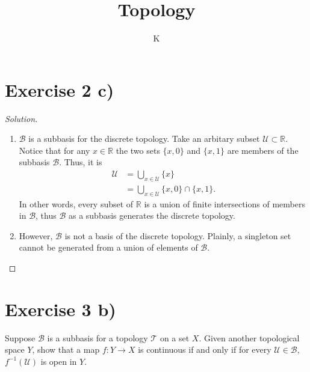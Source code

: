 \documentclass[a4paper]{article}
\title{Topology}
\author{K}
\begin{document}
\section*{Exercise 2 c)}

\begin{proof}[Solution]
    \begin{enumerate}
        \item \(\mathcal{B}\) is a subbasis for the discrete topology. Take an arbitary subset \(\mathcal{U} \subset \mathbb{R}\). Notice that for any \(x \in \mathbb{R}\) the two sets \(\{x, 0\}\) and \(\{x, 1\}\) are members of the subbasis \(\mathcal{B}\). Thus, it is
        \begin{align*}
            \mathcal{U} &= \bigcup_{x \in \mathcal{U}} \{x\} \\
            &= \bigcup_{x \in \mathcal{U}} \{x, 0\} \cap \{x, 1\} \text{.}
        \end{align*}
        In other words, every subset of \(\mathbb{R}\) is a union of finite intersections of members in \(\mathcal{B}\), thus \(\mathcal{B}\) as a subbasis generates the discrete topology.
        \item However, \(\mathcal{B}\) is not a basis of the discrete topology. Plainly, a singleton set cannot be generated from a union of elements of \(\mathcal{B}\).
    \end{enumerate}
\end{proof}

\section*{Exercise 3 b)}
Suppose \(\mathcal{B}\) is a subbasis for a topology \(\mathcal{T}\) on a set \(X\). Given another topological space \(Y\), show that a map \(f: Y \longrightarrow X\) is continuous if and only if for every \(\mathcal{U} \in \mathcal{B}\), \(f^{-1}(\mathcal{U})\) is open in \(Y\).
\end{document}
